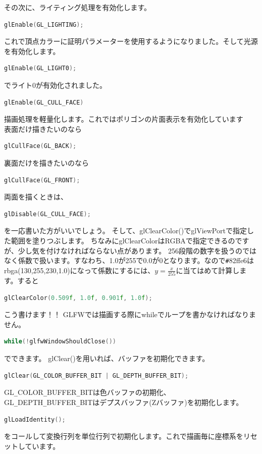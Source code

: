 \documentclass[a4paper,titlepage,dvipdfmx]{jsarticle}
\begin{document}
その次に、ライティング処理を有効化します。
\begin{lstlisting}[language=C++]
glEnable(GL_LIGHTING);
\end{lstlisting}
これで頂点カラーに証明パラメーターを使用するようになりました。そして光源を有効化します。
\begin{lstlisting}[language=C++]
glEnable(GL_LIGHT0);
\end{lstlisting}
でライト0が有効化されました。
\begin{lstlisting}[language=C++]
glEnable(GL_CULL_FACE)
\end{lstlisting}
描画処理を軽量化します。これではポリゴンの片面表示を有効化しています\\
表面だけ描きたいのなら
\begin{lstlisting}[language=C++]
glCullFace(GL_BACK);
\end{lstlisting}
裏面だけを描きたいのなら
\begin{lstlisting}[language=C++]
glCullFace(GL_FRONT);
\end{lstlisting}
両面を描くときは、
\begin{lstlisting}[language=C++]
glDisable(GL_CULL_FACE);
\end{lstlisting}
を一応書いた方がいいでしょう。
そして、glClearColor()でglViewPortで指定した範囲を塗りつぶします。
ちなみにglClearColorはRGBAで指定できるのですが、少し気を付けなければならない点があります。
256段階の数字を扱うのではなく係数で扱います。すなわち、1.0が255で0.0が0となります。なので\verb|#|82ffe6はrbga(130,255,230,1.0)になって係数にするには、$ y = \frac{x}{255} $に当てはめて計算します。すると
\begin{lstlisting}[language=C++]
glClearColor(0.509f, 1.0f, 0.901f, 1.0f);
\end{lstlisting}
こう書けます！！
GLFWでは描画する際にwhileでループを書かなければなりません。
\begin{lstlisting}[language=C++]
while(!glfwWindowShouldClose())
\end{lstlisting}
でできます。
glClear()を用いれば、バッファを初期化できます。
\begin{lstlisting}[language=C++]
glClear(GL_COLOR_BUFFER_BIT | GL_DEPTH_BUFFER_BIT);
\end{lstlisting}
GL\verb|_|COLOR\verb|_|BUFFER\verb|_|BITは色バッファの初期化、GL\verb|_|DEPTH\verb|_|BUFFER\verb|_|BITはデプスバッファ(Zバッファ)を初期化します。
\begin{lstlisting}[language=C++]
glLoadIdentity();
\end{lstlisting}
をコールして変換行列を単位行列で初期化します。これで描画毎に座標系をリセットしています。
\end{document}
